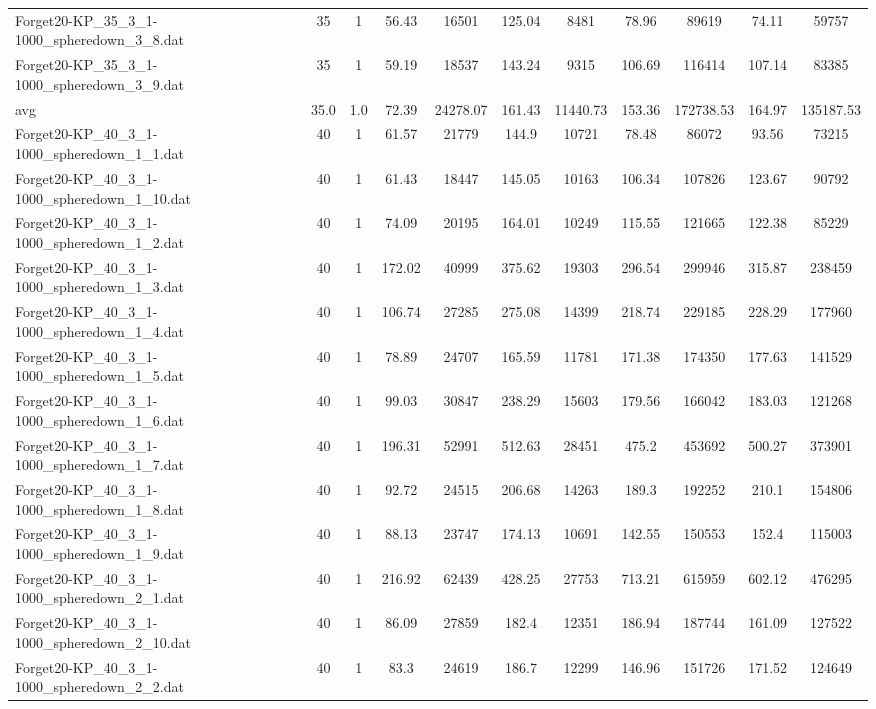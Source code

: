 \begin{table}[!ht]
\begin{tabular}{lcccccccccc}
Forget20-KP\_35\_3\_1-1000\_spheredown\_3\_8.dat & 35 & 1 & 56.43 & 16501 & 125.04 & 8481 & 78.96 & 89619 & 74.11 & 59757 \\
Forget20-KP\_35\_3\_1-1000\_spheredown\_3\_9.dat & 35 & 1 & 59.19 & 18537 & 143.24 & 9315 & 106.69 & 116414 & 107.14 & 83385 \\
\hline avg & 35.0 & 1.0 & 72.39& 24278.07 & 161.43& 11440.73 & 153.36& 172738.53 & 164.97& 135187.53\\ \hline
Forget20-KP\_40\_3\_1-1000\_spheredown\_1\_1.dat & 40 & 1 & 61.57 & 21779 & 144.9 & 10721 & 78.48 & 86072 & 93.56 & 73215 \\
Forget20-KP\_40\_3\_1-1000\_spheredown\_1\_10.dat & 40 & 1 & 61.43 & 18447 & 145.05 & 10163 & 106.34 & 107826 & 123.67 & 90792 \\
Forget20-KP\_40\_3\_1-1000\_spheredown\_1\_2.dat & 40 & 1 & 74.09 & 20195 & 164.01 & 10249 & 115.55 & 121665 & 122.38 & 85229 \\
Forget20-KP\_40\_3\_1-1000\_spheredown\_1\_3.dat & 40 & 1 & 172.02 & 40999 & 375.62 & 19303 & 296.54 & 299946 & 315.87 & 238459 \\
Forget20-KP\_40\_3\_1-1000\_spheredown\_1\_4.dat & 40 & 1 & 106.74 & 27285 & 275.08 & 14399 & 218.74 & 229185 & 228.29 & 177960 \\
Forget20-KP\_40\_3\_1-1000\_spheredown\_1\_5.dat & 40 & 1 & 78.89 & 24707 & 165.59 & 11781 & 171.38 & 174350 & 177.63 & 141529 \\
Forget20-KP\_40\_3\_1-1000\_spheredown\_1\_6.dat & 40 & 1 & 99.03 & 30847 & 238.29 & 15603 & 179.56 & 166042 & 183.03 & 121268 \\
Forget20-KP\_40\_3\_1-1000\_spheredown\_1\_7.dat & 40 & 1 & 196.31 & 52991 & 512.63 & 28451 & 475.2 & 453692 & 500.27 & 373901 \\
Forget20-KP\_40\_3\_1-1000\_spheredown\_1\_8.dat & 40 & 1 & 92.72 & 24515 & 206.68 & 14263 & 189.3 & 192252 & 210.1 & 154806 \\
Forget20-KP\_40\_3\_1-1000\_spheredown\_1\_9.dat & 40 & 1 & 88.13 & 23747 & 174.13 & 10691 & 142.55 & 150553 & 152.4 & 115003 \\
Forget20-KP\_40\_3\_1-1000\_spheredown\_2\_1.dat & 40 & 1 & 216.92 & 62439 & 428.25 & 27753 & 713.21 & 615959 & 602.12 & 476295 \\
Forget20-KP\_40\_3\_1-1000\_spheredown\_2\_10.dat & 40 & 1 & 86.09 & 27859 & 182.4 & 12351 & 186.94 & 187744 & 161.09 & 127522 \\
Forget20-KP\_40\_3\_1-1000\_spheredown\_2\_2.dat & 40 & 1 & 83.3 & 24619 & 186.7 & 12299 & 146.96 & 151726 & 171.52 & 124649 \\

\end{tabular}
\end{table}

